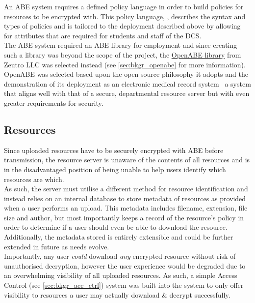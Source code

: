 An ABE system requires a defined policy language in order to build policies for resources to be encrypted with. This policy language, \thePolicyLang, describes the syntax and types of policies and is tailored to the deployment described above by allowing for attributes that are required for students and staff of the DCS.\\
The ABE system required an ABE library for employment and since creating such a library was beyond the scope of the project, the \href{https://github.com/zeutro/openabe}{OpenABE library} from Zeutro LLC was selected instead (see \cref{sec:bkgr_openabe} for more information). OpenABE was selected based upon the open source philosophy it adopts and the demonstration of its deployment as an electronic medical record system \citet{Akinyele2011} \textemdash\ a system that aligns well with that of a secure, departmental resource server but with even greater requirements for security.

\subsection{Resources}
\label{subsec:design_resources}

Since uploaded resources have to be securely encrypted with ABE before transmission, the resource server is unaware of the contents of all resources and is in the disadvantaged position of being unable to help users identify which resources are which.\\
As such, the server must utilise a different method for resource identification and instead relies on an internal database to store metadata of resources as provided when a user performs an upload. This metadata includes filename, extension, file size and author, but most importantly keeps a record of the resource's policy in order to determine if a user should even be able to download the resource. Additionally, the metadata stored is entirely extensible and could be further extended in future as needs evolve.\\
Importantly, any user \textit{could} download \textit{any} encrypted resource without risk of unauthorised decryption, however the user experience would be degraded due to an overwhelming visibility of all uploaded resources. As such, a simple Access Control (see \cref{sec:bkgr_acc_ctrl}) system was built into the system to only offer visibility to resources a user may actually download \& decrypt successfully.
